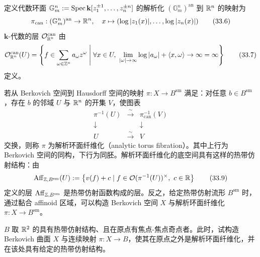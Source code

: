 定义代数环面 $\mathbb{G}_m^n := \operatorname{Spec} \mathbf{k}[z_1^{\pm 1}, \dots, z_n^{\pm n}]$ 的解析化 $(\mathbb{G}_m^n)^{\mathrm{an}}$ 到 $\mathbb{R}^n$ 的映射为
\begin{equation}
\pi_{\mathrm{can}} : (\mathbb{G}_m^n)^{\mathrm{an}} \to \mathbb{R}^n,\quad x \mapsto (\log|z_1(x)|, \dots, \log|z_n(x)|) \tag{33.6}
\end{equation}
$\mathbf{k}$-代数的层 $\mathcal{O}^{\mathrm{can}}_{\mathbb{R}^n}$ 由
\begin{equation}
\cO^{\mathrm{can}}_{\R^n}(U) = \left\{f \in \sum_{\omega \in \Z^n} a_\omega z^\omega \;\middle|\; \forall x \in U,\ \lim_{|\omega| \to \infty} \log|a_\omega| + \langle x,\omega\rangle \to \infty = \infty\right\} \tag{33.7}
\end{equation}
定义。

若从 Berkovich 空间到 Hausdorff 空间的映射 $\pi : X \to B^{\mathrm{sm}}$ 满足：对任意 $b \in B^{\mathrm{sm}}$，存在 $b$ 的邻域 $U$ 与 $\mathbb{R}^n$ 的开集 $V$，使图表
\begin{equation}
\begin{array}{ccc}
\pi^{-1}(U) & \xrightarrow{\ \sim\ } & \pi_{\mathrm{can}}^{-1}(V)\\[4pt]
\downarrow & & \downarrow\\[4pt]
U & \xrightarrow{\ \sim\ } & V
\end{array} \tag{33.8}
\end{equation}
交换，则称 $\pi$ 为解析环面纤维化（analytic torus fibration）。其中上行为 Berkovich 空间的同构，下行为同胚。解析环面纤维化的底空间具有这样的热带仿射结构：由
\begin{equation}
\operatorname{Aff}_{\mathbb{Z},B^{\mathrm{sm}}}(U) := \left\{v(f) + c \mid f \in \mathcal{O}(\pi^{-1}(U))^{\times},\ c \in \mathbb{R}\right\} \tag{33.9}
\end{equation}
定义的层 $\operatorname{Aff}_{\mathbb{Z},B^{\mathrm{sm}}}$ 是热带仿射函数构成的层。反之，给定热带仿射流形 $B^{\mathrm{sm}}$ 时，通过黏合 affinoid 区域，可以构造 Berkovich 空间 $X$ 与解析环面纤维化 $\pi : X \to B^{\mathrm{sm}}$。

\begin{question}
$B$ 取 $\mathbb{R}^2$ 的具有热带仿射结构、且在原点有焦点-焦点奇点者。此时，试构造 Berkovich 曲面 $X$ 与连续映射 $\pi : X \to B$，使其在原点之外是解析环面纤维化，并在该处具有给定的热带仿射结构。
\end{question}

